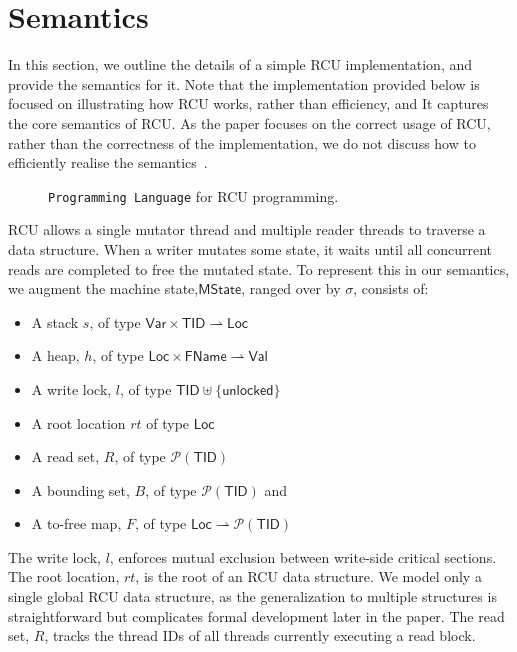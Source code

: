 \section{Semantics}
\label{sec:semantics}
In this section, we outline the details of a simple RCU implementation, and provide the semantics for it. Note that the implementation provided below is focused on illustrating how RCU works, rather than efficiency, and It captures the core semantics of RCU.  As the paper focuses on the correct usage of RCU, rather than the correctness of the implementation, we do not discuss how to efficiently realise the semantics~\cite{Mckenney01read-copyupdate}.
\begin{figure}\scriptsize %
\grammar
\meta
\caption{\texttt{Programming Language} for \textsf{RCU} programming.}
\label{fig:prog-lang}
\end{figure}
RCU allows a single mutator thread and  multiple  reader threads to traverse a data structure. When a writer mutates some state, it waits  until all concurrent reads are completed to free the mutated state. To represent this in our semantics, we augment the  machine state,$\textsf{MState}$, ranged over by $\sigma$, consists of:
\begin{itemize}
\item A stack $s$, of type $\textsf{Var} \times \textsf{TID} \rightharpoonup \textsf{Loc}$
\item A heap, $h$, of type $\textsf{Loc} \times \textsf{FName} \rightharpoonup \textsf{Val}$
\item A write lock, $l$, of type $\textsf{TID} \uplus \{\textsf{unlocked}\}$
\item A root location $rt$ of type $\textsf{Loc}$
\item A read set, $R$, of type $\mathcal{P}(\textsf{TID})$
\item A bounding set, $B$, of type $\mathcal{P}(\textsf{TID})$ and
\item A to-free map, $F$, of type $\textsf{Loc} \rightharpoonup \mathcal{P}(\textsf{TID})$
\end{itemize}
The write lock, $l$, enforces mutual exclusion between write-side critical sections.
The root location, $rt$, is the root of  an \textsf{RCU} data structure. We model only a single global RCU data structure, as the generalization to multiple structures is straightforward but complicates formal development later in the paper.
The read set, $R$, tracks the thread IDs of all threads currently executing a read block. 
